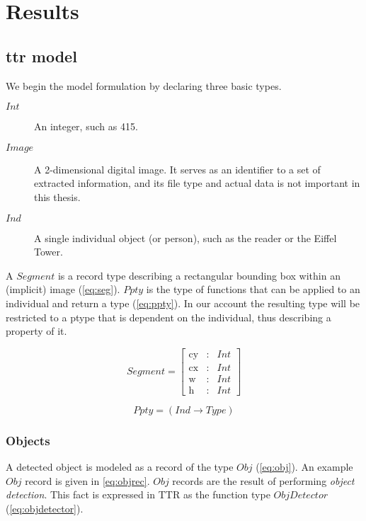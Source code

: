 \section{Results}
\label{sec:results}



\subsection{\Gls{ttr} model}

We begin the model formulation by declaring three basic types.

\begin{description}
\item [$Int$] An integer, such as 415.
\item [$Image$] A 2-dimensional digital image. It serves as an identifier to a set of extracted information, and its file type and actual data is not important in this thesis.
\item [$Ind$] A single individual object (or person), such as the reader or the Eiffel Tower.
\end{description}

A $Segment$ is a record type describing a rectangular bounding box within an (implicit) image (\autoref{eq:seg}).
$Ppty$ is the type of functions that can be applied to an individual and return a type (\autoref{eq:ppty}).
In our account the resulting type will be restricted to a ptype that is dependent on the individual, thus describing a property of it.

\begin{equation}\label{eq:seg}
Segment = \left[\begin{array}{rcl}
\text{cy} &:& Int\\
\text{cx} &:& Int\\
\text{w} &:& Int\\
\text{h} &:& Int
\end{array}\right]\end{equation}

\begin{equation}\label{eq:ppty}
Ppty = (Ind \rightarrow Type)\end{equation}

\subsubsection{Objects}

A detected object is modeled as a record of the type $Obj$ (\autoref{eq:obj}).
An example $Obj$ record is given in \autoref{eq:objrec}.
$Obj$ records are the result of performing \textit{object detection}.
This fact is expressed in TTR as the function type $ObjDetector$ (\autoref{eq:objdetector}).

